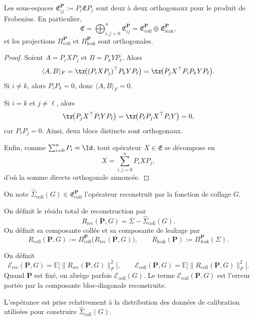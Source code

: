 \begin{lemma}
Les sous-espaces \(\mathfrak E_{ij}^{\mathbf P}:=P_i\mathfrak E P_j\) sont deux à deux orthogonaux pour le produit de Frobenius.
En particulier,
\[
\mathfrak E
=
\bigoplus_{i,j=0}^n \mathfrak E_{ij}^{\mathbf P}
=
\mathfrak E_{\mathrm{coll}}^{\mathbf P}\oplus \mathfrak E_{\mathrm{leak}}^{\mathbf P},
\]
et les projections \(\Pi_{\mathrm{coll}}^{\mathbf P}\) et \(\Pi_{\mathrm{leak}}^{\mathbf P}\) sont orthogonales.
\end{lemma}

\begin{proof}
Soient \(A=P_iXP_j\) et \(B=P_kYP_\ell\). Alors
\[
\langle A,B\rangle_F
=
\tr\!\bigl((P_iXP_j)^\top P_kYP_\ell\bigr)
=
\tr\!\bigl(P_jX^\top P_iP_kYP_\ell\bigr).
\]
Si \(i\neq k\), alors \(P_iP_k=0\), donc \(\langle A,B\rangle_F=0\).

Si \(i=k\) et \(j\neq \ell\), alors
\[
\tr\!\bigl(P_jX^\top P_iYP_\ell\bigr)
=
\tr\!\bigl(P_\ell P_jX^\top P_iY\bigr)=0,
\]
car \(P_\ell P_j=0\). Ainsi, deux blocs distincts sont orthogonaux.

Enfin, comme \(\sum_{i=0}^n P_i=\Id\), tout opérateur \(X\in\mathfrak E\) se décompose en
\[
X=\sum_{i,j=0}^n P_iXP_j,
\]
d'où la somme directe orthogonale annoncée.
\end{proof}

\begin{definition}
On note \(\widehat \Sigma_{\mathrm{coll}}(G)\in\mathfrak E_{\mathrm{coll}}^{\mathbf P}\) l'opérateur reconstruit par la fonction de collage \(G\).

On définit le résidu total de reconstruction par
\[
R_{\mathrm{rec}}(\mathbf P,G)
=
\Sigma-\widehat \Sigma_{\mathrm{coll}}(G).
\]
On définit sa composante collée et sa composante de leakage par
\[
R_{\mathrm{coll}}(\mathbf P,G)
:=
\Pi_{\mathrm{coll}}^{\mathbf P}\!\bigl(R_{\mathrm{rec}}(\mathbf P,G)\bigr),
\qquad
R_{\mathrm{leak}}(\mathbf P)
:=
\Pi_{\mathrm{leak}}^{\mathbf P}(\Sigma).
\]
\end{definition}

\begin{definition}
On définit
\[
\mathcal E_{\mathrm{rec}}(\mathbf P,G)
=
\mathbb E\bigl[\|R_{\mathrm{rec}}(\mathbf P,G)\|_F^2\bigr],
\qquad
\mathcal E_{\mathrm{coll}}(\mathbf P,G)
=
\mathbb E\bigl[\|R_{\mathrm{coll}}(\mathbf P,G)\|_F^2\bigr].
\]
Quand \(\mathbf P\) est fixé, on abrège parfois \(\mathcal E_{\mathrm{coll}}(G)\).
Le terme \(\mathcal E_{\mathrm{coll}}(\mathbf P,G)\) est l'erreur portée par la composante bloc-diagonale reconstruite.

L'espérance est prise relativement à la distribution des données de calibration utilisées pour construire
\(\widehat \Sigma_{\mathrm{coll}}(G)\).
\end{definition}

